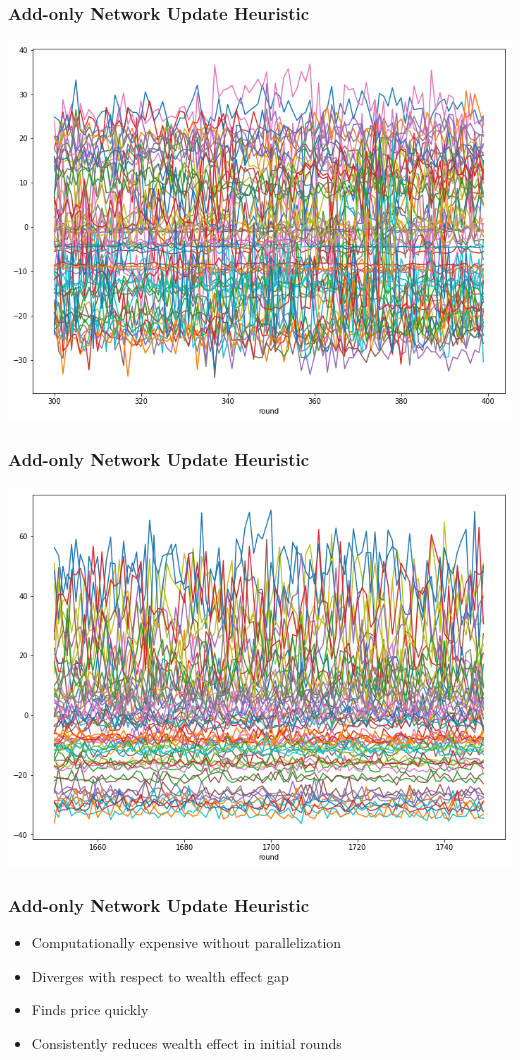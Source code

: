 \documentclass{beamer}
\begin{document}
\begin{frame}
  \frametitle{Add-only Network Update Heuristic}
  \includegraphics[width=\textwidth]{h1bestwealth.png}
\end{frame}

\begin{frame}
  \frametitle{Add-only Network Update Heuristic}
  \includegraphics[width=\textwidth]{h1inequality.png}
\end{frame}

\begin{frame}
  \frametitle{Add-only Network Update Heuristic}
  \begin{itemize}
  \item Computationally expensive without parallelization
  \item Diverges with respect to wealth effect gap
  \item Finds price quickly
  \item Consistently reduces wealth effect in initial rounds
  \end{itemize}
\end{frame}
\end{document}
